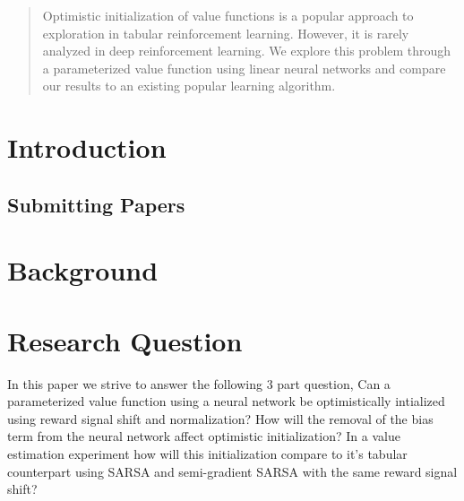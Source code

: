 \documentclass{article}
\theoremstyle{plain}
\theoremstyle{definition}
\theoremstyle{remark}
\begin{document}
\begin{abstract}
Optimistic initialization of value functions is a popular approach to exploration
in tabular reinforcement learning. However, it is rarely analyzed
in deep reinforcement learning. We explore this problem through a parameterized
value function using linear neural networks and compare our results to an existing popular 
learning algorithm.
\end{abstract}

\section{Introduction}

\subsection{Submitting Papers}

\medskip
\section{Background}


\section{Research Question}
In this paper we strive to answer the following 3 part question,
Can a parameterized value function using a neural network be optimistically intialized using reward signal shift and normalization?
How will the removal of the bias term from the neural network affect optimistic initialization?
In a value estimation experiment how will this initialization compare to it's tabular counterpart using 
SARSA and semi-gradient SARSA with the same reward signal shift?
\end{document}
